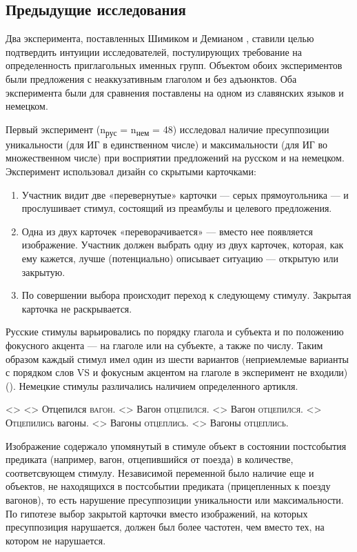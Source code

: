 \documentclass[a4paper, 12pt]{article}
\begin{document}
\subsection{Предыдущие исследования}

Два эксперимента, поставленных Шимиком и Демианом \parencite{simik2020definitenessuniquenessmaximality,simik2021uniquenessmaximalitygerman}, ставили целью подтвердить интуиции исследователей, постулирующих требование на определенность приглагольных именных групп. Объектом обоих экспериментов были предложения с неаккузативным глаголом и без адъюнктов. Оба эксперимента были для сравнения поставлены на одном из славянских языков и немецком.

Первый эксперимент (n\textsubscript{рус} = n\textsubscript{нем} = 48) \parencite{simik2020definitenessuniquenessmaximality} исследовал наличие пресуппозиции уникальности (для ИГ в единственном числе) и максимальности (для ИГ во множественном числе) при восприятии предложений на русском и на немецком. Эксперимент использовал дизайн со скрытыми карточками:

\begin{enumerate}
    \item Участник видит две «перевернутые» карточки — серых прямоугольника — и прослушивает стимул, состоящий из преамбулы и целевого предложения.
    \item Одна из двух карточек «переворачивается» — вместо нее появляется изображение. Участник должен выбрать одну из двух карточек, которая, как ему кажется, лучше (потенциально) описывает ситуацию — открытую или закрытую.
    \item По совершении выбора происходит переход к следующему стимулу. Закрытая карточка не раскрывается.
\end{enumerate}

Русские стимулы варьировались по порядку глагола и субъекта и по положению фокусного акцента — на глаголе или на субъекте, а также по числу. Таким образом каждый стимул имел один из шести вариантов (неприемлемые варианты с порядком слов VS и фокусным акцентом на глаголе в эксперимент не входили) (\nextx). Немецкие стимулы различались наличием определенного артикля.

\pex<>
    \a<> Отцепился \textsc{вагон}.
    \a<> Вагон \textsc{отцепился}.
    \a<> Вагон \textsc{отцепился}.
    \a<> \textsc{Отцепились} вагоны.
    \a<> Вагоны \textsc{отцеплись}.
    \a<> Вагоны \textsc{отцеплись}.
\xe

Изображение содержало упомянутый в стимуле объект в состоянии постсобытия предиката (например, вагон, отцепившийся от поезда) в количестве, соответсвующем стимулу. Независимой переменной было наличие еще и объектов, не находящихся в постсобытии предиката (прицепленных к поезду вагонов), то есть нарушение пресуппозиции уникальности или максимальности. По гипотезе выбор закрытой карточки вместо изображений, на которых пресуппозиция нарушается, должен был более частотен, чем вместо тех, на котором не нарушается.
\end{document}
